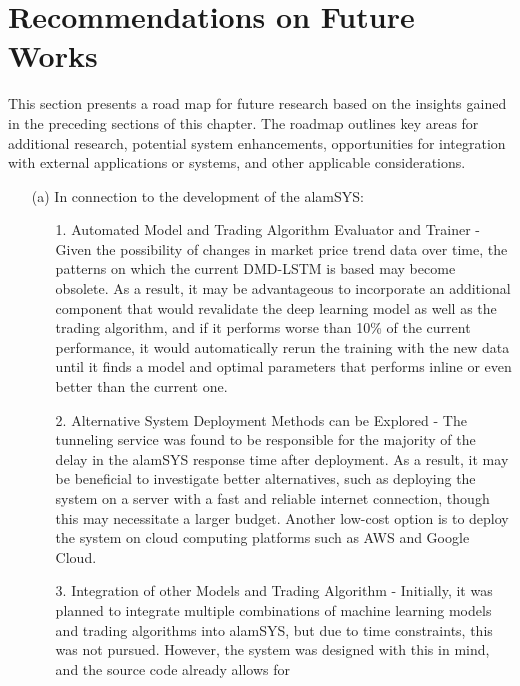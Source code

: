 \section{Recommendations on Future Works}
\label{sec:recommendations}
This section presents a road map for future research based 
on the insights gained in the preceding sections of this chapter. 
The roadmap outlines key areas for additional research, potential 
system enhancements, opportunities for integration with external 
applications or systems, and other applicable considerations.

\begin{itemize}
    \item[(a)] In connection to the development of the alamSYS:
        \begin{itemize}
            \item[1.] Automated Model and Trading Algorithm Evaluator and Trainer - 
            Given the possibility of changes in market price trend data 
            over time, the patterns on which the current DMD-LSTM is based may 
            become obsolete. As a result, it may be advantageous to incorporate 
            an additional component that would revalidate the deep learning 
            model as well as the trading algorithm, and if it performs worse 
            than 10\% of the current performance, it would automatically 
            rerun the training with the new data until it finds a model and 
            optimal parameters that performs inline or even better than the 
            current one.
            \item[2.] Alternative System Deployment Methods can be Explored - 
            The tunneling service was found to be responsible for the 
            majority of the delay in the alamSYS response time after deployment. 
            As a result, it may be beneficial to investigate better alternatives, 
            such as deploying the system on a server with a fast and reliable 
            internet connection, though this may necessitate a larger budget. 
            Another low-cost option is to deploy the system on cloud computing 
            platforms such as AWS and Google Cloud.
            \item[3.] Integration of other Models and Trading Algorithm - 
            Initially, it was planned to integrate multiple combinations of 
            machine learning models and trading algorithms into alamSYS, but due 
            to time constraints, this was not pursued. However, the system was 
            designed with this in mind, and the source code already allows for 

\end{itemize}
\end{itemize}
